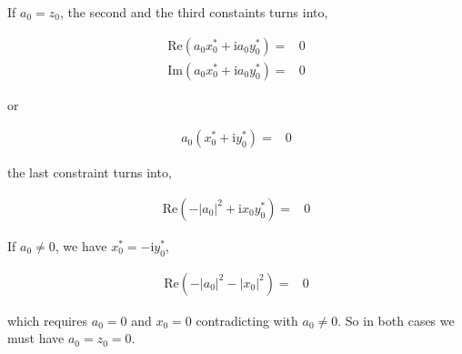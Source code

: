 \documentclass[10pt,fleqn]{article}
\newcommand{\ui}{\mathrm{i}}
\newcommand{\eqar}[1]
{
  \begin{align*}
    #1
  \end{align*}
}
\newcommand{\paren}[1]{{\left({#1}\right)}}
\newcommand{\abs}[1]{{\left|{#1}\right|}}
\begin{document}
If $a_0=z_0$, the second and the third constaints turns into,
\eqar{
  \mathrm{Re}\paren{a_0 x_0^* + \ui a_0 y_0^*}=&0\\
  \mathrm{Im}\paren{a_0 x_0^* + \ui a_0 y_0^*}=&0
}
or
\eqar{
  a_0 \paren{x_0^* + \ui y_0^*}=&0
}
the last constraint turns into,
\eqar{
  \mathrm{Re}\paren{-\abs{a_0}^2 + \ui x_0 y_0^*}=&0
}
If $a_0\neq0$, we have $x_0^* = -\ui y_0^*$,
\eqar{
  \mathrm{Re}\paren{-\abs{a_0}^2 - \abs{x_0}^2}=&0
}
which requires $a_0=0$ and $x_0=0$ contradicting with $a_0\neq0$.
So in both cases we must have $a_0=z_0=0$.
\end{document}

